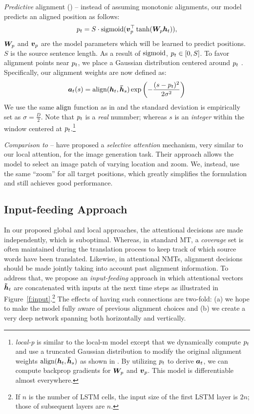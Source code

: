 \textit{Predictive} alignment ({\bf \localp{}}) --  %
instead of assuming monotonic alignments, our model predicts an aligned position as follows:
\begin{equation}
p_{t} = S \cdot \operatorname{sigmoid}(\mbox{\boldmath{$v$}}_p^\top\tanh(\bm{W}_{p}\mbox{\boldmath{$h$}}_{t})),
\label{e:p}
\end{equation}
$\bm{W}_{p}$ and $\mbox{\boldmath{$v$}}_p$ are the model parameters which will be learned
to predict positions. $S$ is the source sentence length. As a result of $\operatorname{sigmoid}$, $p_{t}
\in [0, S]$. To favor alignment points near $p_{t}$, we place a Gaussian distribution centered around $p_{t}$ . Specifically, our alignment weights are now
defined as:
\begin{equation}
\mbox{\boldmath{$a$}}_{t}(s) = \operatorname{align}(\mbox{\boldmath{$h$}}_{t}, \mbox{\boldmath{$\bar{h}$}}_{s}) \exp \left(-\frac{(s-p_{t})^2}{2\sigma^2}\right) 
\label{e:align_p}
\end{equation}
We use the same $\operatorname{align}$ function as in
 and the standard deviation is empirically set as
$\sigma\!=\!\frac{D}{2}$. Note that $p_{t}$ is a {\it real} nummber; whereas $s$
is an {\it integer} within the window centered at $p_{t}$.\footnote{{\it local-p} is similar to the
local-m model except that we dynamically
compute $p_{t}$ and use a truncated Gaussian distribution to modify the original alignment
weights $\operatorname{align}(\mbox{\boldmath{$h$}}_{t}, \mbox{\boldmath{$\bar{h}$}}_{s})$ as shown in . By utilizing $p_{t}$
to derive $\mbox{\boldmath{$a$}}_{t}$, we can compute backprop gradients for $\bm{W}_{p}$ and $\mbox{\boldmath{$v$}}_p$.
This model is differentiable almost everywhere.} 

\textit{Comparison to \cite{draw15}} --
have proposed a {\it selective attention} mechanism, very
similar to our local attention, for the image generation task. Their approach 
allows the model to select an image patch of varying location and zoom. We,
instead, use the same ``zoom'' for all target positions, which greatly
simplifies the formulation and still achieves good
performance.

\subsection{Input-feeding Approach}
\label{subsec:input}
In our proposed global and local approaches, the attentional decisions are made
independently, which is suboptimal. Whereas, in standard MT, a {\it coverage}
set is often maintained during the translation process to keep track of which
source words have been translated. Likewise, in attentional NMTs, alignment
decisions should be made jointly taking into account past alignment information.
To address that, we propose an {\it input-feeding} approach in which attentional
vectors $\mbox{\boldmath{$\tilde{h}$}}_{t}$ are concatenated with inputs at the next time steps as illustrated in
Figure~\ref{f:input}.\footnote{If $n$ is the number of LSTM cells, the
input size of the first LSTM layer is $2n$; those of subsequent
layers are $n$.} The effects of having such connections are two-fold:
(a) we hope to make the model fully aware of previous alignment choices and (b)
we create a very deep network spanning both horizontally and vertically.

